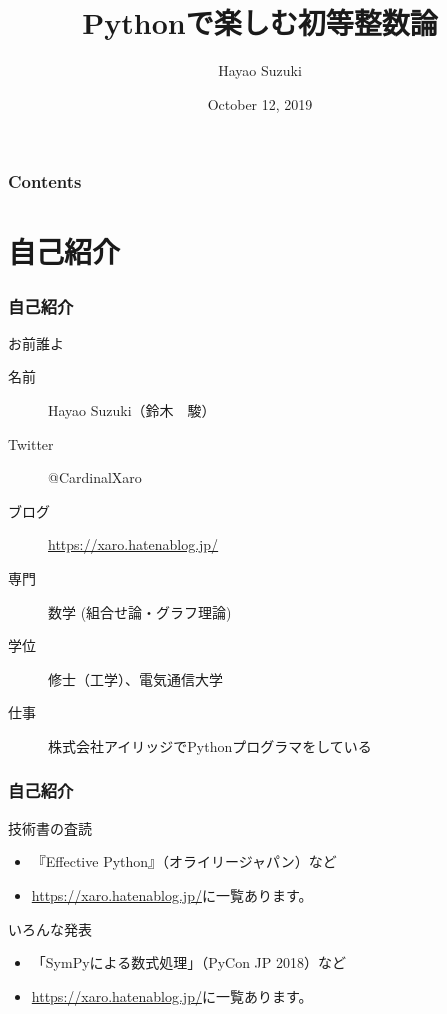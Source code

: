 \documentclass[dvipdfmx,11pt,notheorems]{beamer}
\title[Number Theory with Python]{Pythonで楽しむ初等整数論}
\author[Hayao]{Hayao Suzuki}
\institute[Hiroshima 2019]{PyCon mini Hiroshima 2019}
\date{October 12, 2019}
\theoremstyle{definition}
\begin{document}
\begin{frame}[plain]\frametitle{}
\titlepage %
\end{frame}

\begin{frame}\frametitle{Contents}
\tableofcontents %
\end{frame}

\section{自己紹介}

\begin{frame}\frametitle{自己紹介}

\begin{block}{お前誰よ}
\begin{description}
\item[名前] Hayao Suzuki（鈴木　駿）
\item[Twitter] @CardinalXaro
\item[ブログ] \url{https://xaro.hatenablog.jp/}
\item[専門] 数学 (組合せ論・グラフ理論)
\item[学位] 修士（工学）、電気通信大学
\item[仕事] 株式会社アイリッジでPythonプログラマをしている
\end{description}
\end{block}

\end{frame}

\begin{frame}\frametitle{自己紹介}

\begin{block}{技術書の査読}
\begin{itemize}
\item 『Effective Python』（オライリージャパン）など
\item \url{https://xaro.hatenablog.jp/}に一覧あります。
\end{itemize}
\end{block}

\begin{block}{いろんな発表}
\begin{itemize}
\item 「SymPyによる数式処理」（PyCon JP 2018）など
\item \url{https://xaro.hatenablog.jp/}に一覧あります。
\end{itemize}
\end{block}

\end{frame}
\end{document}
